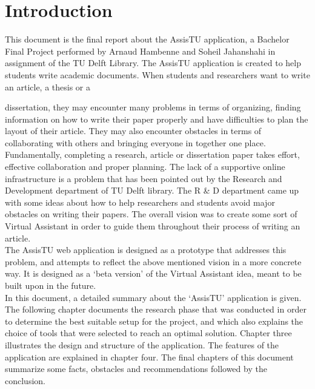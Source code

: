 \chapter{Introduction}

This document is the final report about the AssisTU application, a Bachelor Final Project performed by Arnaud Hambenne and Soheil Jahanshahi in
assignment of the TU Delft Library. 
The AssisTU application is created to help students write academic documents. When students and researchers want to write an article, a thesis or a 

dissertation, they may encounter many problems in terms of organizing, finding information on how to write their paper properly and have difficulties 
to plan the layout of their article. They may also encounter obstacles in terms of collaborating with others and bringing everyone in together one 
place. \\

Fundamentally, completing a research, article or dissertation paper takes effort, effective collaboration and proper planning. The lack of a supportive
online infrastructure is a problem that has been pointed out by the Research and Development department of TU Delft library. The R \& D department came 
up with some ideas about how to help researchers and students avoid major obstacles on writing their papers. The overall vision was to create some sort 
of Virtual Assistant in order to guide them throughout their process of writing an article.\\

The AssisTU web application is designed as a prototype that addresses this problem, and attempts to reflect the above mentioned vision in a more 
concrete way. It is designed as a `beta version' of the Virtual Assistant idea, meant to be built upon in the future.\\ 

In this document, a detailed summary about the `AssisTU' application is given. The following chapter documents the research phase that was conducted in 
order to determine the best suitable setup for the project, and which also explains the choice of tools that were selected to reach an optimal solution. 
Chapter three illustrates the design and structure of the application. The features of the application are explained in chapter four. The final chapters 
of this document summarize some facts, obstacles and recommendations followed by the conclusion.  